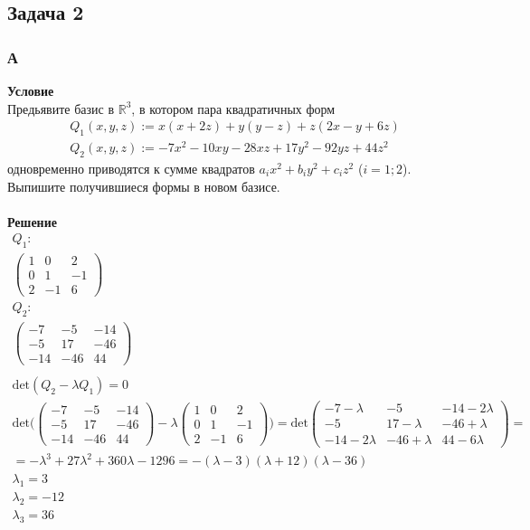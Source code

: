 		
		\subsection*{\textbf{Задача 2}}
		\subsubsection*{\textbf{А}}
		\textbf{Условие}\\
		Предьявите базис в $\mathbb{R}^3$, в котором пара квадратичных форм
		\begin{gather*}
			Q_{1}(x, y, z):=x(x+2 z)+y(y-z)+z(2 x-y+6 z)\\
			Q_{2}(x, y, z):=-7 x^{2}-10 x y-28 x z+17 y^{2}-92 y z+44 z^{2}
		\end{gather*}
		одновременно приводятся к сумме квадратов $a_ix^2 + b_iy^2 + c_iz^2$ ($i = 1; 2$). Выпишите получившиеся формы в новом базисе.\\
		\\
		\textbf{Решение}\\
		\begin{gather*}
			Q_1:\\
			\begin{pmatrix}
				1 & 0 & 2\\
				0 & 1 & -1\\
				2 & -1 & 6
			\end{pmatrix}
			\\
			Q_2:\\
			\begin{pmatrix}
				-7 & -5 & -14\\
				-5 & 17 & -46\\
				-14 & -46 & 44
			\end{pmatrix}\\
			\\
			\text{det}(Q_2 - \lambda Q_1) = 0\\
			\text{det}
			\Bigg(
			\begin{pmatrix}
				-7 & -5 & -14\\
				-5 & 17 & -46\\
				-14 & -46 & 44
			\end{pmatrix}
			-
			\lambda
			\begin{pmatrix}
				1 & 0 & 2\\
				0 & 1 & -1\\
				2 & -1 & 6
			\end{pmatrix}
			\Bigg)
			=
			\text{det}
			\begin{pmatrix}
				-7-\lambda & -5 & -14-2\lambda\\
				-5 & 17-\lambda & -46+\lambda\\
				-14-2\lambda & -46+\lambda & 44-6\lambda
			\end{pmatrix}
			=\\
			= -\lambda^3 + 27\lambda^2 + 360\lambda - 1296 = -(\lambda-3)(\lambda+12)(\lambda-36)\\
			\lambda_1 = 3\\
			\lambda_2 = -12\\
			\lambda_3 = 36\\		
		\end{gather*}

